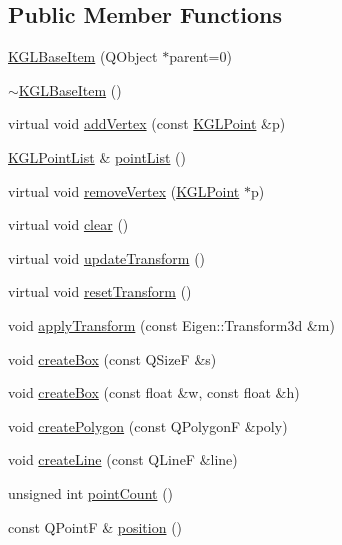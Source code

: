 \subsection*{Public Member Functions}
\begin{CompactItemize}
\item 
\hyperlink{class_k_g_l_base_item_9743d8f5ce7ec1de26267c6d34bf6303}{KGLBaseItem} (QObject $\ast$parent=0)
\item 
\hyperlink{class_k_g_l_base_item_8aaeca0452e979304a98056441a14cdd}{$\sim$KGLBaseItem} ()
\item 
virtual void \hyperlink{class_k_g_l_base_item_3eabedeecf9e7b82d82557c95c56741a}{addVertex} (const \hyperlink{class_k_g_l_point}{KGLPoint} \&p)
\item 
\hyperlink{class_k_g_l_point_list}{KGLPointList} \& \hyperlink{class_k_g_l_base_item_83092e2126b730daf7d774630113bb66}{pointList} ()
\item 
virtual void \hyperlink{class_k_g_l_base_item_58c4e6cb39b23d5f313f425cf9afc99c}{removeVertex} (\hyperlink{class_k_g_l_point}{KGLPoint} $\ast$p)
\item 
virtual void \hyperlink{class_k_g_l_base_item_b84b10f4cbeeb352cf91f327a564b377}{clear} ()
\item 
virtual void \hyperlink{class_k_g_l_base_item_6e020830d4452864cdb6c8fea4531e0d}{updateTransform} ()
\item 
virtual void \hyperlink{class_k_g_l_base_item_5aa1d880fffcc82847dc7eff4e7aecba}{resetTransform} ()
\item 
void \hyperlink{class_k_g_l_base_item_49c808d884735aa2df77d8673c250535}{applyTransform} (const Eigen::Transform3d \&m)
\item 
void \hyperlink{class_k_g_l_base_item_180099829489993a95ec445a46ac49d3}{createBox} (const QSizeF \&s)
\item 
void \hyperlink{class_k_g_l_base_item_092dd2a3401a1192fecbf63c8a486777}{createBox} (const float \&w, const float \&h)
\item 
void \hyperlink{class_k_g_l_base_item_849ec6bf857c964042b8c2f1305fd5b1}{createPolygon} (const QPolygonF \&poly)
\item 
void \hyperlink{class_k_g_l_base_item_810379a4aac12d9061b14b2aa3e55ea6}{createLine} (const QLineF \&line)
\item 
unsigned int \hyperlink{class_k_g_l_base_item_22a498a5b8fdd0eb6ffcca48678a58a1}{pointCount} ()
\item 
const QPointF \& \hyperlink{class_k_g_l_base_item_40e86b4a2929ae6b230fb0764af53c3c}{position} ()

\end{CompactItemize}
